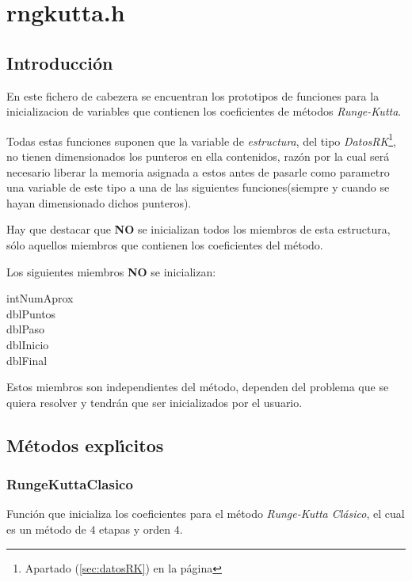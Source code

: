 %
%

\chapter{rngkutta.h}

\section{Introducci\'on}
En este fichero de cabezera se encuentran los prototipos de funciones para
la inicializacion de variables que contienen los coeficientes de m\'etodos
\emph{\mbox{Runge-Kutta}}.\newline

Todas estas funciones suponen que la variable de \emph{estructura}, del tipo
\emph{DatosRK}\footnote{Apartado (\ref{sec:datosRK}) en la p\'agina 
\pageref{sec:datosRK}}, no tienen dimensionados los punteros en ella 
contenidos, raz\'on por la cual ser\'a necesario liberar la memoria asignada
a estos antes de pasarle como parametro una variable de este tipo a una de
las siguientes funciones(siempre y cuando se hayan dimensionado dichos
punteros).\newline

Hay que destacar que \textbf{NO} se inicializan todos los miembros de esta
estructura, s\'olo aquellos miembros que contienen los coeficientes del 
m\'etodo.\newline

Los siguientes miembros \textbf{NO} se inicializan:
%
\begin{description}
\item[intNumAprox]
\item[dblPuntos]
\item[dblPaso]
\item[dblInicio]
\item[dblFinal]
\end{description}

Estos miembros son independientes del m\'etodo, dependen del problema que
se quiera resolver y tendr\'an que ser inicializados por el usuario.

\section{M\'etodos expl\'{\i}citos}

\subsection{RungeKuttaClasico}
Funci\'on que inicializa los coeficientes para el m\'etodo \emph{Runge-Kutta 
Cl\'asico}, el cual es un m\'etodo de $4$ etapas y orden $4$.\newline

